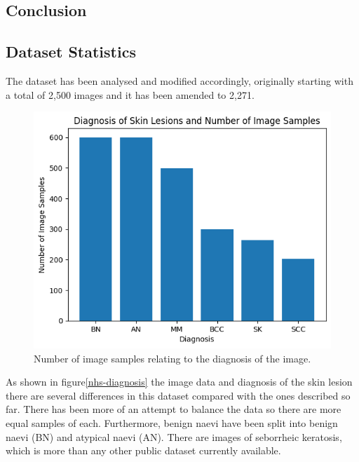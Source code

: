\subsection{Conclusion}



\subsection{Dataset Statistics}
The dataset has been analysed and modified accordingly, originally starting with a total of 2,500 images and it has been amended to 2,271.

\begin{figure}
    \centering
    \includegraphics[scale=0.75]{images/nhs/nhs-diagnosis.png}
    \caption{Number of image samples relating to the diagnosis of the image.} 
\end{figure}\label{nhs-diagnosis}

 As shown in figure\ref{nhs-diagnosis} the image data and diagnosis of the skin lesion there are several differences in this dataset compared with the ones described so far. There has been more of an attempt to balance the data so there are more equal samples of each. Furthermore, benign naevi have been split into benign naevi (BN) and atypical naevi (AN). There are images of seborrheic keratosis, which is more than any other public dataset currently available. 

